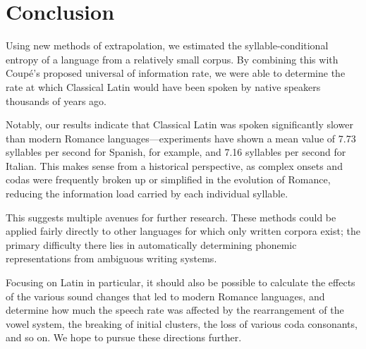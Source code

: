 \documentclass{article}
\begin{document}
\section{Conclusion}

Using new methods of extrapolation, we estimated the syllable-conditional entropy of a language from a relatively small corpus. By combining this with Coupé's proposed universal of information rate, we were able to determine the rate at which Classical Latin would have been spoken by native speakers thousands of years ago.

Notably, our results indicate that Classical Latin was spoken significantly slower than modern Romance languages---experiments have shown a mean value of 7.73 syllables per second for Spanish, for example, and 7.16 syllables per second for Italian. This makes sense from a historical perspective, as complex onsets and codas were frequently broken up or simplified in the evolution of Romance, reducing the information load carried by each individual syllable.

This suggests multiple avenues for further research. These methods could be applied fairly directly to other languages for which only written corpora exist; the primary difficulty there lies in automatically determining phonemic representations from ambiguous writing systems.

Focusing on Latin in particular, it should also be possible to calculate the effects of the various sound changes that led to modern Romance languages, and determine how much the speech rate was affected by the rearrangement of the vowel system, the breaking of initial clusters, the loss of various coda consonants, and so on. We hope to pursue these directions further.

\nocite{*}

\printbibliography
\end{document}
